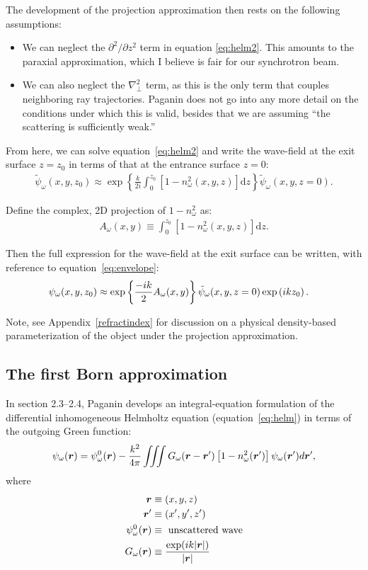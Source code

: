 \documentclass{article}
\begin{document}
The development of the projection approximation then rests on the following
assumptions:
\begin{itemize}
\item We can neglect the $\partial^2/\partial z^2$ term in equation \ref{eq:helm2}.
  This amounts to the paraxial approximation, which I believe is fair for our
  synchrotron beam.

\item We can also neglect the $\nabla^2_{\perp}$ term, as this is the only
  term that couples neighboring ray trajectories. Paganin does not go into
  any more detail on the conditions under which this is valid, besides
  that we are assuming ``the scattering is sufficiently weak.''
\end{itemize}

From here, we can solve equation~\ref{eq:helm2} and write the wave-field at the
exit surface $z=z_0$ in terms of that at the entrance surface $z=0$:
\begin{align}
  \tilde{\psi}_{\omega}(x,y,z_0) \approx \exp\left\{\frac{k}{2i}\int_0^{z_0} \left[1 - n_{\omega}^2(x,y,z)\right] \mathrm{d}z\right\}\tilde{\psi}_{\omega}(x,y,z=0).
  \label{eq:236}
\end{align}

Define the complex, 2D projection of $1-n_{\omega}^2$ as:
\begin{align}
  A_{\omega}(x, y) \equiv \int_0^{z_0}\left[1 - n_{\omega}^2(x,y,z)\right]\mathrm{d}z.
\end{align}

Then the full expression for the wave-field at the exit surface can be written, with
reference to equation~\ref{eq:envelope}:
\begin{align}
  \psi_{\omega}(x, y, z_0) &\approx \exp\left\{\frac{-ik}{2}A_{\omega}(x,y)\right\}\tilde{\psi}_{\omega}(x,y,z=0)\exp\left(ikz_0\right).\label{eq:projectionapproximation}
\end{align}

Note, see Appendix~\ref{refractindex} for discussion on a physical density-based
parameterization of the object under the projection approximation.

\subsection{The first Born approximation}
In section 2.3--2.4, Paganin develops an integral-equation formulation
of the differential inhomogeneous Helmholtz equation (equation~\ref{eq:helm}) in terms of the outgoing
Green function:
\begin{align}
  \psi_{\omega}(\bm{r}) = \psi_{\omega}^0(\bm{r}) - \frac{k^2}{4\pi}\iiint G_{\omega}(\bm{r}-\bm{r}')\left[1 - n_{\omega}^2(\bm{r}')\right]\psi_{\omega}(\bm{r}')d\bm{r}',
  \label{eq:born0}
\end{align}
where
\begin{align}
  \bm{r} &\equiv (x,y,z)\nonumber\\
  \bm{r}' &\equiv (x', y', z')\nonumber\\
  \psi_{\omega}^0(\bm{r}) &\equiv \text{ unscattered wave}\nonumber\\
  G_{\omega}(\bm{r}) &\equiv \frac{\exp(ik|\bm{r}|)}{|\bm{r}|}\nonumber
\end{align}
\end{document}
